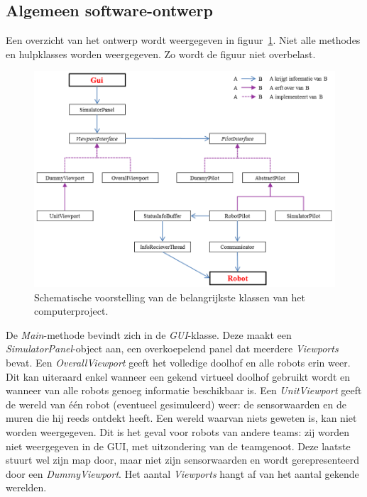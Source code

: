 \documentclass[eind]{penoverslag}
\begin{document}
\subsection{Algemeen software-ontwerp}
\label{ssec:Sdesign}
Een overzicht van het ontwerp wordt weergegeven in figuur~\ref{fig:klasSoft}. Niet alle methodes en hulpklasses worden weergegeven. Zo wordt de figuur niet overbelast.\\

\begin{figure}
\centering
		\includegraphics[width=\textwidth]{KlasSoftware}
\caption[Structuur van computerproject]{Schematische voorstelling van de belangrijkste klassen van het computerproject.}
\label{fig:klasSoft}
\end{figure}

De \textit{Main}-methode bevindt zich in de \textit{GUI}-klasse. Deze maakt een \textit{SimulatorPanel}-object aan, een overkoepelend panel dat meerdere \textit{Viewports} bevat. Een \textit{OverallViewport} geeft het volledige doolhof en alle robots erin weer. Dit kan uiteraard enkel wanneer een gekend virtueel doolhof gebruikt wordt en wanneer van alle robots genoeg informatie beschikbaar is. Een \textit{UnitViewport} geeft de wereld van \'e\'en robot (eventueel gesimuleerd) weer: de sensorwaarden en de muren die hij reeds ontdekt heeft. Een wereld waarvan niets geweten is, kan niet worden weergegeven. Dit is het geval voor robots van andere teams: zij worden niet weergegeven in de GUI, met uitzondering van de teamgenoot. Deze laatste stuurt wel zijn map door, maar niet zijn sensorwaarden en wordt gerepresenteerd door een \textit{DummyViewport}. Het aantal \textit{Viewports} hangt af van het aantal gekende werelden.\\
\end{document}
